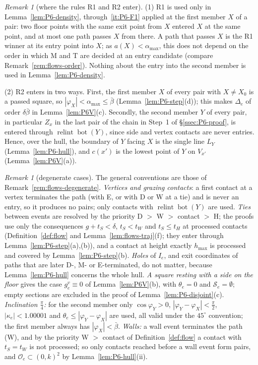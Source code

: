 \documentclass[11pt]{amsart}
\newcommand{\relint}{\operatorname{relint}}
\newcommand{\Bot}{\operatorname{bot}}
\newcommand{\amax}{\alpha_{\max}}
\newcommand{\hmax}{h_{\max}}
\newcommand{\bbar}{\bar\beta}
\theoremstyle{definition}
\theoremstyle{remark}
\newtheorem{remark}[theorem]{Remark}
\numberwithin{equation}{section}
\begin{document}
\begin{remark}[where the rules R1 and R2 enter]\label{rem:P6-rules}
(1) R1 is used only in Lemma~\ref{lem:P6-density}, through~\ref{it:P6-F1} applied at the first member $X$ of a pair:
two floor points with the same exit point from $X$ entered $X$ at the same point, and at most one path passes $X$ from
there. A path that passes $X$ is the R1 winner at its entry point into $X$; as $a(X)<\amax$, this does not depend on
the order in which M and T are decided at an entry candidate (compare Remark~\ref{rem:flows-order}). Nothing about the
entry into the second member is used in Lemma~\ref{lem:P6-density}.

(2) R2 enters in two ways. First, the first member $X$ of every pair with $X\neq X_0$ is a passed square, so
$|\varphi_X|<\amax\le\bbar$ (Lemma~\ref{lem:P6-step}(d)); this makes $\Delta_e$ of order $\delta\bbar$ in
Lemma~\ref{lem:P6V}(c). Secondly, the second member $Y$ of every pair, in particular $Z_x$ in the last pair of the
chain in Step~1 of \S\ref{ssec:P6-proof}, is entered through $\relint\Bot(Y)$, since side and vertex contacts are
never entries. Hence, over the hull, the boundary of $Y$ facing $X$ is the single line $L_Y$
(Lemma~\ref{lem:P6-hull}), and $c(x')$ is the lowest point of $Y$ on $V_{x'}$ (Lemma~\ref{lem:P6V}(a)).
\end{remark}

\begin{remark}[degenerate cases]\label{rem:P6-degenerate}
The general conventions are those of Remark~\ref{rem:flows-degenerate}. \emph{Vertices and grazing contacts}: a first contact at a vertex
terminates the path (with E, or with D or W at a tie) and is never an entry, so it produces no pairs; only contacts with
$\relint\Bot(Y)$ are used. \emph{Ties} between
events are resolved by the priority D $>$ W $>$ contact $>$ H; the proofs use only the consequences $g+t_S<\delta$,
$t_S<t_W$ and $t_S\le t_H$ at processed contacts (Definition~\ref{def:flow} and Lemma~\ref{lem:flows-traj}(f); they enter
through Lemma~\ref{lem:P6-step}(a),(b)), and a contact at height exactly $\hmax$ is
processed and covered by Lemma~\ref{lem:P6-step}(b). \emph{Holes} of $I_e$, and exit coordinates of paths that are
later D-, M- or E-terminated, do not matter, because Lemma~\ref{lem:P6-hull} concerns the whole hull. \emph{A square
resting with a side on the floor} gives the case $g^v_e\equiv0$ of Lemma~\ref{lem:P6V}(b), with $\theta_e=0$ and
$\mathcal S_e=\emptyset$; empty sections are excluded in the proof of Lemma~\ref{lem:P6-disjoint}(c).
\emph{Inclination $\frac\pi4$:} for the second member only $\cos\varphi_Y>0$, $|\varphi_Y-\varphi_X|<\frac\pi2$,
$|\kappa_e|<1.00001$ and $\theta_e\le|\varphi_Y-\varphi_X|$ are used, all valid under the $45^\circ$ convention; the
first member always has $|\varphi_X|<\bbar$. \emph{Walls:} a wall event terminates the path (W), and by the priority W $>$ contact of Definition~\ref{def:flow} a
contact with $t_S=t_W$ is not processed; so only contacts reached before a wall event form pairs, and $\mathcal O_e\subset(0,k)^2$ by Lemma~\ref{lem:P6-hull}(ii).
\end{remark}
\end{document}
